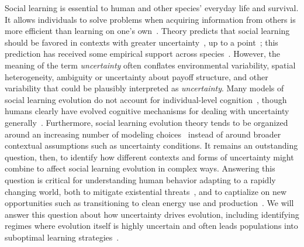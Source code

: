 \documentclass[letterpaper,11.5pt]{scrartcl}
\begin{document}
Social learning is essential to human and other species' everyday life and survival.
It allows individuals to solve problems when acquiring information from others is
more efficient than learning on one's own~\cite{Laland2004}. Theory predicts that
social learning should be favored in contexts with greater
uncertainty~\cite{BoydRicherson1985,Henrich1998}, up to a
point~\cite{Rogers1988,Feldman1996}; this prediction has received some empirical
support across species~\cite{McElreath2005,Kendal2018,Allen2019}.  However, the
meaning of the term \emph{uncertainty} often conflates environmental variability,
spatial heterogeneity, ambiguity or uncertainty about payoff structure, and other
variability that could be plausibly interpreted as \emph{uncertainty}.  Many models
of social learning evolution do not account for 
individual-level cognition~\cite{Heyes2016}, though humans
clearly have evolved cognitive mechanisms for dealing with 
uncertainty generally~\cite{Gershman2019,Schulz2019}.
Furthermore, social learning evolution theory tends to be organized around an
increasing number of modeling choices~\cite[Figure 1]{Kendal2018} instead
of around broader contextual assumptions such as uncertainty conditions. It remains
an outstanding question, then, to identify how different contexts and forms of
uncertainty might combine to affect social learning evolution in complex ways.
Answering this question is critical for understanding human behavior adapting to a
rapidly changing world, both to mitigate existential
threats~\cite{Moya2020,Jones2021}, and to captialize on new opportunities such as
transitioning to clean energy use and
production~\cite{NatureEnergyEditorialPromisesPremises2018,Brisbois2022}.
We will answer this question about how uncertainty drives evolution, including
identifying regimes where evolution itself is highly uncertain and often 
leads populations into suboptimal learning strategies~\cite{Rogers1988}.
\end{document}
